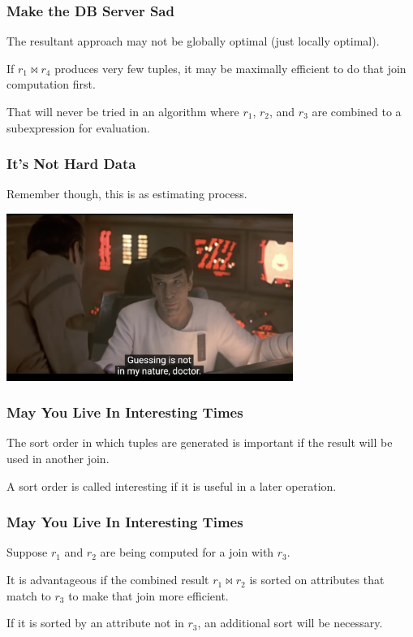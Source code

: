 \begin{frame}
\frametitle{Make the DB Server Sad}

The resultant approach may not be globally optimal (just locally optimal). 

If $r_{1} \bowtie r_{4}$ produces very few tuples, it may be maximally efficient to do that join computation first.

That will never be tried in an algorithm where $r_{1}$, $r_{2}$, and $r_{3}$ are combined to a subexpression for evaluation. 

\end{frame}

\begin{frame}
\frametitle{It's Not Hard Data}

Remember though, this is as estimating process. 

\begin{center}
	\includegraphics[width=0.7\textwidth]{images/guessing.png}
\end{center}

\end{frame}

\begin{frame}
\frametitle{May You Live In Interesting Times}

The sort order in which tuples are generated is important if the result will be used in another join. 

A sort order is called \alert{interesting} if it is useful in a later operation. 

\end{frame}

\begin{frame}
\frametitle{May You Live In Interesting Times}

Suppose $r_{1}$ and $r_{2}$ are being computed for a join with $r_{3}$.

It is advantageous if the combined result $r_{1} \bowtie r_{2}$ is sorted on attributes that match to $r_{3}$ to make that join more efficient.

If it is sorted by an attribute not in $r_{3}$, an additional sort will be necessary.

\end{frame}


